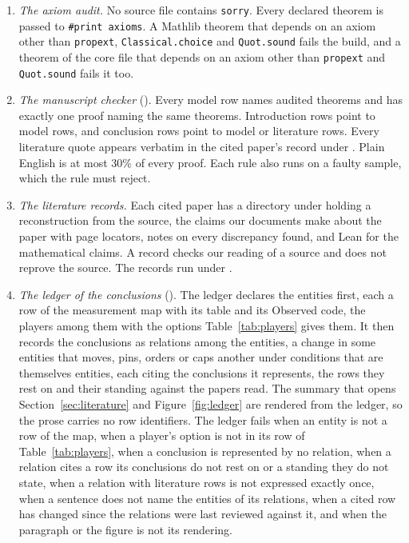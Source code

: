 \begin{enumerate}
\item \emph{The axiom audit.} No source file contains \texttt{sorry}. Every
  declared theorem is passed to \texttt{\#print axioms}. A Mathlib theorem that
  depends on an axiom other than \texttt{propext}, \texttt{Classical.choice} and
  \texttt{Quot.sound} fails the build, and a theorem of the core file that
  depends on an axiom other than \texttt{propext} and \texttt{Quot.sound} fails
  it too.
\item \emph{The manuscript checker} ().
  Every model row names audited theorems and has exactly one proof naming the
  same theorems. Introduction rows point to model rows, and conclusion rows
  point to model or literature rows. Every literature quote appears verbatim
  in the cited paper's record under . Plain English is at most 30\%
  of every proof. Each rule also runs on a faulty sample, which the rule must
  reject.
\item \emph{The literature records.} Each cited paper has a directory under
   holding a reconstruction from the source, the claims our
  documents make about the paper with page locators, notes on every
  discrepancy found, and Lean for the mathematical claims. A record checks our
  reading of a source and does not reprove the source. The records run under
  .
\item \emph{The ledger of the conclusions} ().
  The ledger declares the entities first, each a row of the measurement map
  with its table and its Observed code, the players among them with the
  options Table~\ref{tab:players} gives them. It then records the conclusions
  as relations among the entities, a change in some entities that moves, pins,
  orders or caps another under conditions that are themselves entities, each
  citing the conclusions it represents, the rows they rest on and their
  standing against the papers read. The summary that opens
  Section~\ref{sec:literature} and Figure~\ref{fig:ledger} are rendered from
  the ledger, so the prose carries no row identifiers. The ledger fails when an
  entity is not a row of the map, when a player's option is not in its row of
  Table~\ref{tab:players}, when a conclusion is represented by no relation, when
  a relation cites a row its conclusions do not rest on or a standing they do
  not state, when a relation with literature rows is not expressed exactly once,
  when a sentence does not name the entities of its relations, when a cited row
  has changed since the relations were last reviewed against it, and when the
  paragraph or the figure is not its rendering.
\end{enumerate}

